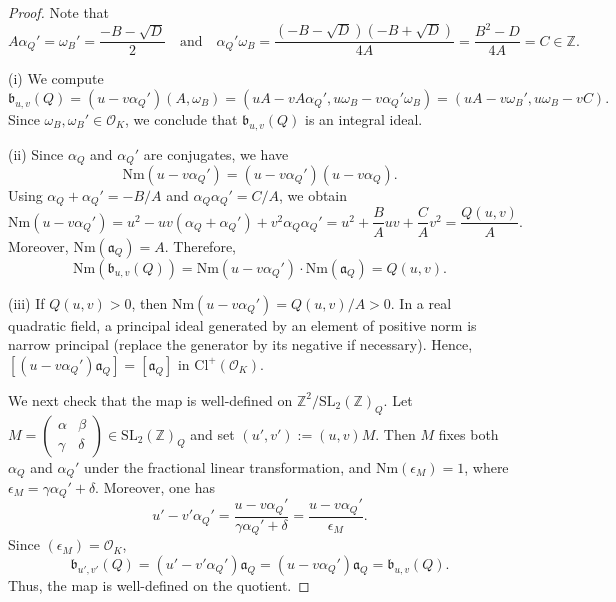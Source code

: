 \documentclass[10pt,a4paper]{amsart}
\begin{document}
\begin{proof}
Note that
$$A\alpha_{Q}'=\omega_{B}'=\frac{-B-\sqrt{D}}{2}\quad\text{and}\quad\alpha_{Q}'\omega_{B}=\frac{(-B-\sqrt{D})(-B+\sqrt{D})}{4A}=\frac{B^{2}-D}{4A}=C\in\mathbb{Z}.$$

(i) We compute
$$\mathfrak{b}_{u,v}(Q)=(u-v\alpha_{Q}')(A,\omega_{B})=(uA-vA\alpha_{Q}',u\omega_{B}-v\alpha_{Q}'\omega_{B})=(uA-v\omega_{B}',u\omega_{B}-vC).$$
Since $\omega_{B},\omega_{B}'\in\mathcal{O}_{K}$, we conclude that $\mathfrak{b}_{u,v}(Q)$ is an integral ideal.

(ii) Since $\alpha_Q$ and $\alpha_Q'$ are conjugates, we have
$$\mathrm{Nm}(u-v\alpha_{Q}')=(u-v\alpha_{Q}')(u-v\alpha_{Q}).$$
Using $\alpha_{Q}+\alpha_{Q}'=-B/A$ and $\alpha_{Q}\alpha_{Q}'=C/A$, we obtain
$$\mathrm{Nm}(u-v\alpha_{Q}')=u^{2}-uv(\alpha_{Q}+\alpha_{Q}')+v^{2}\alpha_{Q}\alpha_{Q}'=u^{2}+\frac{B}{A}uv+\frac{C}{A}v^{2}=\frac{Q(u,v)}{A}.$$
Moreover, $\mathrm{Nm}(\mathfrak{a}_{Q})=A$. Therefore,
$$\mathrm{Nm}(\mathfrak{b}_{u,v}(Q))=\mathrm{Nm}(u-v\alpha_{Q}')\cdot\mathrm{Nm}(\mathfrak{a}_{Q})=Q(u,v).$$

(iii) If $Q(u,v)>0$, then $\mathrm{Nm}(u-v\alpha_Q')=Q(u,v)/A>0$.
In a real quadratic field, a principal ideal generated by an element of positive norm is narrow principal (replace the generator by its negative if necessary).
Hence, $[(u-v\alpha_{Q}')\mathfrak{a}_{Q}]=[\mathfrak{a}_{Q}]$ in $\mathrm{Cl}^{+}(\mathcal{O}_{K})$.

We next check that the map is well-defined on $\mathbb{Z}^{2}/\mathrm{SL}_{2}(\mathbb{Z})_{Q}$.
Let $M=\left(\begin{smallmatrix} \alpha & \beta \\ \gamma & \delta\end{smallmatrix}\right)\in\mathrm{SL}_{2}(\mathbb{Z})_{Q}$ and set $(u',v'):=(u,v)M$.
Then $M$ fixes both $\alpha_{Q}$ and $\alpha_{Q}'$ under the fractional linear transformation, and $\mathrm{Nm}(\epsilon_{M})=1$, where $\epsilon_{M}=\gamma\alpha_{Q}'+\delta$.
Moreover, one has
$$u'-v'\alpha_{Q}'=\frac{u-v\alpha_{Q}'}{\gamma\alpha_{Q}'+\delta}=\frac{u-v\alpha_{Q}'}{\epsilon_{M}}.$$
Since $(\epsilon_{M})=\mathcal{O}_{K}$,
$$\mathfrak{b}_{u',v'}(Q)=(u'-v'\alpha_{Q}')\mathfrak{a}_{Q}=(u-v\alpha_{Q}')\mathfrak{a}_{Q}=\mathfrak{b}_{u,v}(Q).$$
Thus, the map is well-defined on the quotient.


\end{proof}
\end{document}
